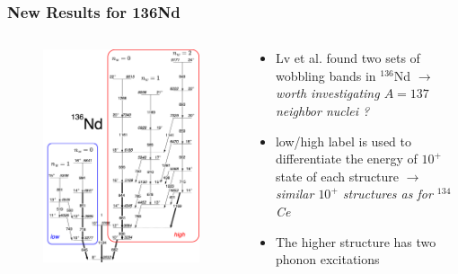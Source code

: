 \documentclass{beamer}
\begin{document}
\begin{frame}
  \frametitle{New Results for 136Nd}
  \begin{columns}
    \begin{column}{0.5\textwidth}
      \begin{figure}
        \centering
        \includegraphics[scale=0.1]{Figs/triaxial-shapes-136Nd.png}
      \end{figure}
    \end{column}
    \begin{column}{0.6\textwidth}
      \begin{itemize}
        \item Lv et al. found two sets of wobbling bands in $^{136}$Nd $\rightarrow$ \emph{worth investigating $A=137$ neighbor nuclei ?}
        \item low/high label is used to differentiate the energy of $10^+$ state of each structure $\rightarrow$ \emph{similar $10^+$ structures as for $^{134}$Ce}
        \item The higher structure has two phonon excitations
      \end{itemize}
    \end{column}
  \end{columns}
\end{frame}
\end{document}
